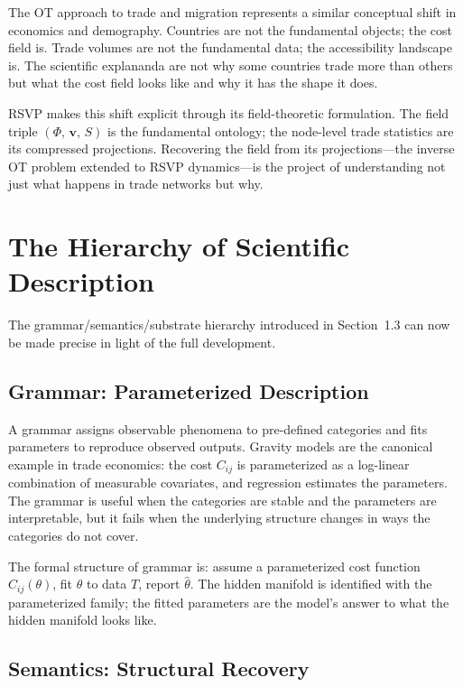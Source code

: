 \documentclass[12pt]{article}
\newcommand{\FieldTriple}{(\Phi,\,\mathbf{v},\,S)}
\begin{document}
The OT approach to trade and migration represents a similar conceptual shift in economics and demography. Countries are not the fundamental objects; the cost field is. Trade volumes are not the fundamental data; the accessibility landscape is. The scientific explananda are not why some countries trade more than others but what the cost field looks like and why it has the shape it does.

RSVP makes this shift explicit through its field-theoretic formulation. The field triple $\FieldTriple$ is the fundamental ontology; the node-level trade statistics are its compressed projections. Recovering the field from its projections---the inverse OT problem extended to RSVP dynamics---is the project of understanding not just what happens in trade networks but why.

\section{The Hierarchy of Scientific Description}

The grammar/semantics/substrate hierarchy introduced in Section~1.3 can now be made precise in light of the full development.

\subsection{Grammar: Parameterized Description}

A grammar assigns observable phenomena to pre-defined categories and fits parameters to reproduce observed outputs. Gravity models are the canonical example in trade economics: the cost $C_{ij}$ is parameterized as a log-linear combination of measurable covariates, and regression estimates the parameters. The grammar is useful when the categories are stable and the parameters are interpretable, but it fails when the underlying structure changes in ways the categories do not cover.

The formal structure of grammar is: assume a parameterized cost function $C_{ij}(\theta)$, fit $\theta$ to data $T$, report $\hat\theta$. The hidden manifold is identified with the parameterized family; the fitted parameters are the model's answer to what the hidden manifold looks like.

\subsection{Semantics: Structural Recovery}
\end{document}

